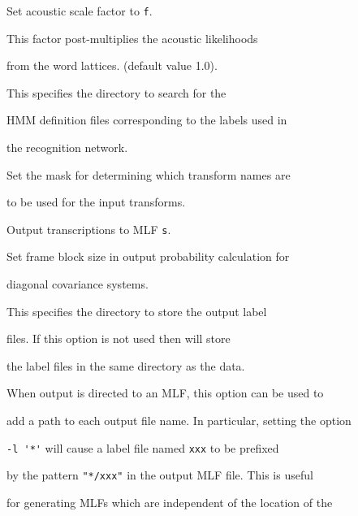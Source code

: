 \begin{optlist}





   Set acoustic scale factor to \texttt{f}.


                This factor post-multiplies the acoustic likelihoods


                from the word lattices.  (default value 1.0).





   This specifies the directory to search for the


        HMM definition files corresponding to the labels used in


        the recognition network.





   Set the mask for determining which transform names are 


	to be used for the input transforms. 





   Output transcriptions to MLF \texttt{s}.





   Set frame block size in output probability calculation for


  diagonal covariance systems.





   This specifies the directory to store the  output label 


        files.  If this option is not used then  will store 


        the label files in the same directory as the data. 


        When output is directed to an MLF, this option can be used to


      add a path to each output file name.  In particular, setting the option


      \verb+-l '*'+ will cause a label file named \texttt{xxx} to be prefixed


      by the pattern \verb+"*/xxx"+ in the output MLF file.  This is useful


      for generating MLFs which are independent of the location of the 



\end{optlist}
